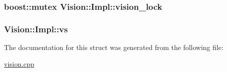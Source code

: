 \hypertarget{structVision_1_1Impl_a33fe92eb538bb740d834b26566911872}{
\subsubsection[{vision\-\_\-lock}]{\setlength{\rightskip}{0pt plus 5cm}boost\-::mutex Vision\-::\-Impl\-::vision\-\_\-lock}}\label{structVision_1_1Impl_a33fe92eb538bb740d834b26566911872}
\hypertarget{structVision_1_1Impl_a16f1c91fc04d6d1f1652d09921a8c78d}{
\subsubsection[{vs}]{ Vision\-::\-Impl\-::vs}}\label{structVision_1_1Impl_a16f1c91fc04d6d1f1652d09921a8c78d}


The documentation for this struct was generated from the following file\-:\begin{DoxyCompactItemize}
\item 
\hyperlink{vision_8cpp}{vision.\-cpp}\end{DoxyCompactItemize}
